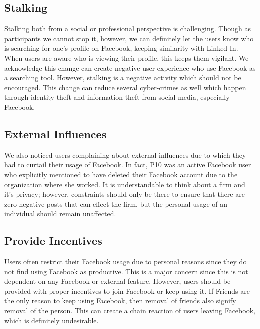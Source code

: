 \subsection{Stalking}
Stalking both from a social or professional perspective is challenging. Though as participants we cannot stop it, however, we can definitely let the users know who is searching for one's profile on Facebook, keeping similarity with Linked-In. When users are aware who is viewing their profile, this keeps them vigilant. We acknowledge this change can create negative user experience who use Facebook as a searching tool. However, stalking is a negative activity which should not be encouraged. This change can reduce several cyber-crimes as well which happen through identity theft and information theft from social media, especially Facebook.
\subsection{External Influences}
We also noticed users complaining about external influences due to which they had to curtail their usage of Facebook. In fact, P10 was an active Facebook user who explicitly mentioned to have deleted their Facebook account due to the organization where she worked. It is understandable to think about a firm and it's privacy; however, constraints should only be there to ensure that there are zero negative posts that can effect the firm, but the personal usage of an individual should remain unaffected.
\subsection{Provide Incentives}
Users often restrict their Facebook usage due to personal reasons since they do not find using Facebook as productive. This is a major concern since this is not dependent on any Facebook or external feature. However, users should be provided with proper incentives to join Facebook or keep using it. If Friends are the only reason to keep using Facebook, then removal of friends also signify removal of the person. This can create a chain reaction of users leaving Facebook, which is definitely undesirable.
